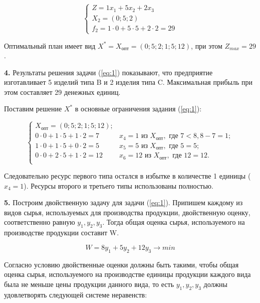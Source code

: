 \begin{equation*}
  \begin{cases}
    Z = 1 x_1 + 5 x_2 + 2 x_3\\
    X_2 = (0;5;2)\\
    f_2 = 1 \cdot 0 + 5 \cdot 5 + 2 \cdot 2 = 29
  \end{cases}
\end{equation*}

Оптимальный план имеет вид $X^*=X_{\text{опт}}=(0;5;2;1;5;12)$,
при этом $Z_{max} = 29$.

\textbf{4.}
Результаты решения задачи (\ref{eq:1}) показывают, что предприятие изготавливает 5 изделий типа B и 2 изделия типа C.
Максимальная прибыль при этом составляет 29 денежных единиц.

Поставим решение $X^*$ в основные ограничения задания (\ref{eq:1}):

\begin{equation*}
  \begin{cases}
    X_{\text{опт}}=(0;5;2;1;5;12);\\
    0 \cdot 0 + 1 \cdot 5 + 1 \cdot 2 = 7   &x_4 = 1 \text{ из } X_{\text{опт}}, \text{ где } 7<8, 8-7=1;\\
    1 \cdot 0 + 1 \cdot 5 + 0 \cdot 2 = 5   &x_5 = 5 \text{ из } X_{\text{опт}}, \text{ где } 5=5;\\
    0 \cdot 0 + 2 \cdot 5 + 1 \cdot 2 = 12  &x_6 = 12 \text{ из } X_{\text{опт}}, \text{ где } 12=12.\\
  \end{cases}
\end{equation*}

Следовательно ресурс первого типа остался в избытке в количестве 1 единицы ($x_4 = 1$). Ресурсы второго и третьего типы использованы полностью.

\textbf{5.}
Построим двойственную задачу для задачи (\ref{eq:1}).
Припишем каждому из видов сырья, используемых для производства продукции,
двойственную оценку, соответственно равную $y_1, y_2, y_3$.
Тогда общая оценка сырья, используемого на производстве продукции составит W.

\begin{equation}\label{eq:3}
  W = 8 y_1 + 5 y_2 + 12 y_3 \to min
\end{equation}

Согласно условию двойственные оценки должны быть такими, чтобы общая оценка сырья,
используемого на производстве единицы продукции каждого вида была не меньше цены продукции данного вида,
то есть $y_1, y_2, y_3$ должны удовлетворять следующей системе неравенств:


